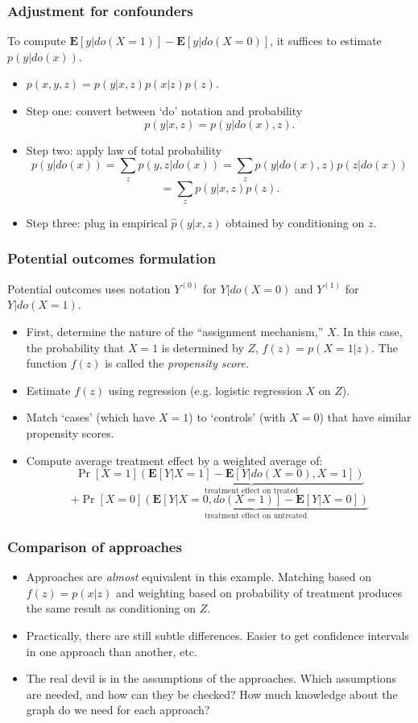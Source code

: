 \documentclass{beamer}
\newcommand{\E}{\textbf{E}}
\begin{document}
\begin{frame}
\frametitle{Adjustment for confounders}
To compute $\E[y|do(X=1)] - \E[y|do(X=0)]$, it suffices to estimate $p(y|do(x))$.
\begin{itemize}
\item $p(x, y, z) = p(y|x,z)p(x|z)p(z).$
\item Step one: convert between `do' notation and probability
\[
p(y | x, z) = p(y | do(x), z).
\]
\item Step two: apply law of total probability
\[
p(y|do(x)) = \sum_z p(y, z|do(x)) = \sum_z p(y|do(x), z) p(z|do(x))\]\[ = \sum_z p(y|x, z) p(z).
\]
\item Step three: plug in empirical $\hat{p}(y|x, z)$ obtained by conditioning on $z$.
\end{itemize}
\end{frame}

\begin{frame}
\frametitle{Potential outcomes formulation}
Potential outcomes uses notation $Y^{(0)}$ for $Y|do(X=0)$ and $Y^{(1)}$ for $Y|do(X = 1)$.
\begin{itemize}
\item First, determine the nature of the ``assignment mechanism,'' $X$.  In this case, the probability that $X=1$ is determined by $Z$,
$f(z) = p(X=1|z).$
The function $f(z)$ is called the \emph{propensity score.}
\item Estimate $f(z)$ using regression (e.g. logistic regression $X$ on $Z$).
\item Match `cases'  (which have $X=1$) to `controls' (with $X=0$) that have similar propensity scores.
\item Compute average treatment effect by a weighted average of:
\[
\Pr[X=1]\underbrace{(\E[Y|X=1] - \E[Y|do(X=0), X=1])}_{\text{treatment effect on treated}}\]\[
+\Pr[X=0]\underbrace{(\E[Y|X=0, do(X=1)] - \E[Y|X=0])}_{\text{treatment effect on untreated}}
\]
\end{itemize}
\end{frame}

\begin{frame}
\frametitle{Comparison of approaches}
\begin{itemize}
\item Approaches are \emph{almost} equivalent in this example.
Matching based on $f(z)=p(x|z)$ and weighting based on probability of treatment
produces the same result as conditioning on $Z$.
\item Practically, there are still subtle differences.  Easier to get confidence intervals in one approach than another, etc.
\item The real devil is in the assumptions of the approaches.  Which assumptions are needed, and how can they be checked?
How much knowledge about the graph do we need for each approach?
\end{itemize}
\end{frame}
\end{document}
